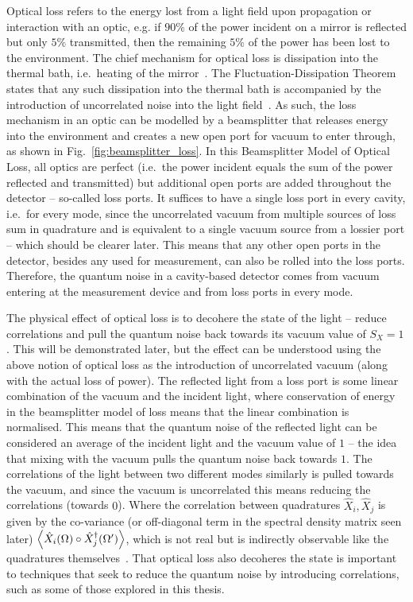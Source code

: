 Optical loss refers to the energy lost from a light field upon propagation or interaction with an optic, e.g. if $90\%$ of the power incident on a mirror is reflected but only $5\%$ transmitted, then the remaining $5\%$ of the power has been lost to the environment. The chief mechanism for optical loss is dissipation into the thermal bath, i.e.\ heating of the mirror~\cite{}. The Fluctuation-Dissipation Theorem states that any such dissipation into the thermal bath is accompanied by the introduction of uncorrelated noise into the light field~\cite{}. As such, the loss mechanism in an optic can be modelled by a beamsplitter that releases energy into the environment and creates a new open port for vacuum to enter through, as shown in Fig.~\ref{fig:beamsplitter_loss}. In this Beamsplitter Model of Optical Loss, all optics are perfect (i.e.\ the power incident equals the sum of the power reflected and transmitted) but additional open ports are added throughout the detector -- so-called loss ports. It suffices to have a single loss port in every cavity, i.e.\ for every mode, since the uncorrelated vacuum from multiple sources of loss sum in quadrature and is equivalent to a single vacuum source from a lossier port -- which should be clearer later. %
This means that any other open ports in the detector, besides any used for measurement, can also be rolled into the loss ports. Therefore, the quantum noise in a cavity-based detector comes from vacuum entering at the measurement device and from loss ports in every mode.

The physical effect of optical loss is to decohere the state of the light -- reduce correlations and pull the quantum noise back towards its vacuum value of $S_X=1$. This will be demonstrated later, but the effect can be understood using the above notion of optical loss as the introduction of uncorrelated vacuum (along with the actual loss of power). The reflected light from a loss port is some linear combination of the vacuum and the incident light, where conservation of energy in the beamsplitter model of loss means that the linear combination is normalised. This means that the quantum noise of the reflected light can be considered an average of the incident light and the vacuum value of $1$ -- the idea that mixing with the vacuum pulls the quantum noise back towards $1$. The correlations of the light between two different modes similarly is pulled towards the vacuum, and since the vacuum is uncorrelated this means reducing the correlations (towards $0$). Where the correlation between quadratures $\hat{X}_i, \hat{X}_j$ is given by the co-variance (or off-diagonal term in the spectral density matrix seen later) $\ev{\hat{X}_i(\Omega)\circ\hat{X}_j^\dag(\Omega')}$, which is not real but is indirectly observable like the quadratures themselves~\cite{}. That optical loss also decoheres the state is important to techniques that seek to reduce the quantum noise by introducing correlations, such as some of those explored in this thesis.

